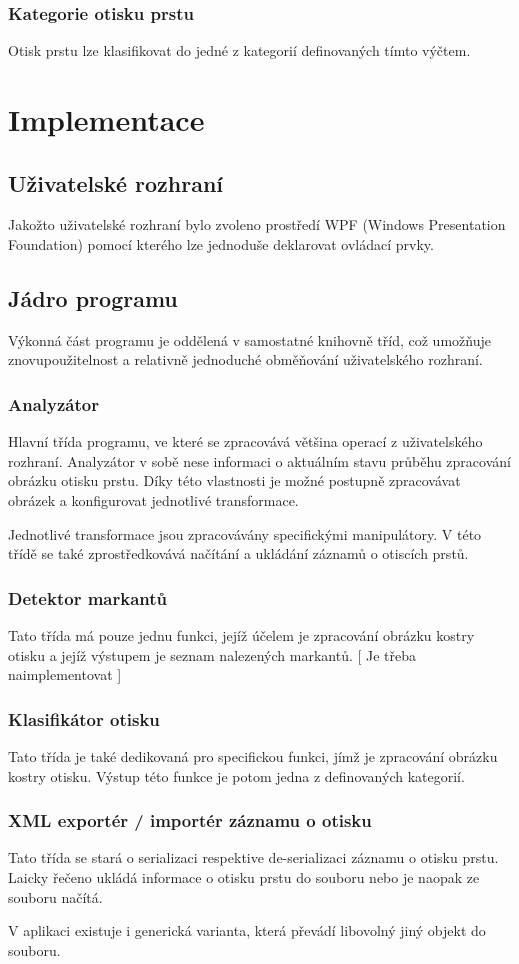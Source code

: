 \documentclass[12pt,a4paper]{article}
\let\oldsection\section
\renewcommand\section{\clearpage\oldsection}
\begin{document}
\subsubsection{Kategorie otisku prstu}
Otisk prstu lze klasifikovat do jedné z kategorií definovaných tímto výčtem.

\section{Implementace}
\subsection{Uživatelské rozhraní}
Jakožto uživatelské rozhraní bylo zvoleno prostředí WPF (Windows Presentation Foundation) pomocí kterého lze jednoduše deklarovat ovládací prvky.
\subsection{Jádro programu}
Výkonná část programu je oddělená v samostatné knihovně tříd, což umožňuje znovupoužitelnost a relativně jednoduché obměňování uživatelského rozhraní.
\subsubsection{Analyzátor}
Hlavní třída programu, ve které se zpracovává většina operací z uživatelského rozhraní. Analyzátor v sobě nese informaci o aktuálním stavu průběhu zpracování obrázku otisku prstu. Díky této vlastnosti je možné postupně zpracovávat obrázek a konfigurovat jednotlivé transformace. \par
Jednotlivé transformace jsou zpracovávány specifickými manipulátory.
V této třídě se také zprostředkovává načítání a ukládání záznamů o otiscích prstů.
\subsubsection{Detektor markantů}
Tato třída má pouze jednu funkci, jejíž účelem je zpracování obrázku kostry otisku a jejíž výstupem je seznam nalezených markantů.
{[} Je třeba naimplementovat {]}
\subsubsection{Klasifikátor otisku}
Tato třída je také dedikovaná pro specifickou funkci, jímž je zpracování obrázku kostry otisku. Výstup této funkce je potom jedna z definovaných kategorií.
\subsubsection{XML exportér / importér záznamu o otisku}
Tato třída se stará o serializaci respektive de-serializaci záznamu o otisku prstu. Laicky řečeno ukládá informace o otisku prstu do souboru nebo je naopak ze souboru načítá. \par
V aplikaci existuje i generická varianta, která převádí libovolný jiný objekt do souboru.
\end{document}
